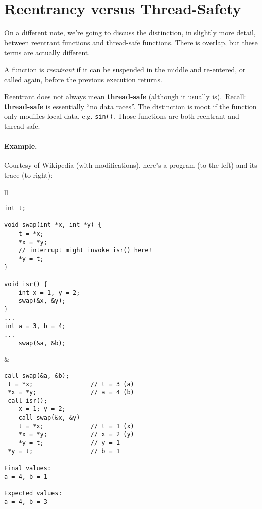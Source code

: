 




\section*{Reentrancy versus Thread-Safety}
On a different note, we're going to discuss the distinction, in slightly more detail, between reentrant functions and thread-safe functions. There is overlap, but these terms are actually different.

A function is \emph{reentrant} if it can be suspended in the middle
and re-entered, or called again, before the previous execution
returns.
    
Reentrant does not always mean {\bf thread-safe} (although it usually is).\
Recall: {\bf thread-safe} is essentially ``no data races''. The distinction is moot if the function only modifies local data, e.g. {\tt sin()}.
Those functions are both reentrant and thread-safe.

\paragraph{Example.} Courtesy of Wikipedia (with modifications), here's a program (to the left) and its trace (to right):
\begin{center}
\begin{tabular}{ll}
\begin{minipage}{.5\textwidth}
  \begin{lstlisting}[basicstyle=\scriptsize]
int t;
 
void swap(int *x, int *y) {
    t = *x;
    *x = *y;
    // interrupt might invoke isr() here!
    *y = t;
}
 
void isr() {
    int x = 1, y = 2;
    swap(&x, &y);
}
...
int a = 3, b = 4;
...
    swap(&a, &b);
  \end{lstlisting}
\end{minipage}
&
\begin{minipage}{.4\textwidth}
  \begin{lstlisting}[basicstyle=\scriptsize]
call swap(&a, &b);
 t = *x;                // t = 3 (a)
 *x = *y;               // a = 4 (b)
 call isr();
    x = 1; y = 2;
    call swap(&x, &y)
    t = *x;             // t = 1 (x)
    *x = *y;            // x = 2 (y)
    *y = t;             // y = 1
 *y = t;                // b = 1

Final values:
a = 4, b = 1

Expected values:
a = 4, b = 3
  \end{lstlisting}
\end{minipage}
\end{tabular}
\end{center}


